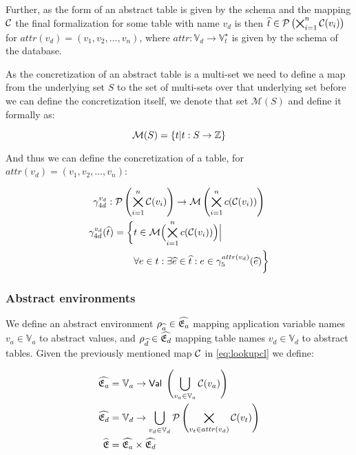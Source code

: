 Further, as the form of an abstract table is given by the schema and the mapping $\mathcal{C}$ the final formalization for some table with name $v_d$ is then $\widehat{t} \in \mathcal{P}\left(\bigtimes_{i = 1}^{n}\mathcal{C}(v_i)\right)$ for $attr(v_d) = (v_1, v_2, \dots, v_n)$, where $attr : \mathbb{V}_d \rightarrow \mathbb{V}_t^\star$ is given by the schema of the database.

As the concretization of an abstract table is a multi-set we need to define a map from the underlying set $S$ to the set of multi-sets over that underlying set before we can define the concretization itself, we denote that set $\mathcal{M}(S)$ and define it formally as:


\begin{equation}
    \mathcal{M}(S) = \{t | t : S \rightarrow \nums\}\label{eq:equation-nums}
\end{equation}


And thus we can define the concretization of a table, for $attr(v_d) = (v_1, v_2, \dots, v_n)$:


\begin{gather}
    \gamma^{v_d}_{4d} : \mathcal{P}\left(\bigtimes_{i = 1}^{n}\mathcal{C}(v_i)\right) \rightarrow \mathcal{M}\left(\bigtimes_{i = 1}^n c(\mathcal{C}(v_i))\right)\\
    \begin{split}
        \gamma^{v_d}_{4d}(\widehat{t}) = \biggl\{ &t \in \mathcal{M}\Bigl(\bigtimes_{i = 1}^n c(\mathcal{C}(v_i))\Bigr) \Big|\\
        &\forall e \in t : \exists \widehat{e} \in \widehat{t} : e \in \gamma^{attr(v_d)}_5(\widehat{e}) \biggr\}
    \end{split}
\end{gather}


\subsubsection{Abstract environments}\label{subsubsec:absenv}
We define an abstract environment $\rho_{\widehat{a}} \in \widehat{\mathfrak{E}_a}$ mapping application variable names $v_a \in \mathbb{V}_a$ to abstract values, and $\rho_{\widehat{d}} \in \widehat{\mathfrak{E}_d}$ mapping table names $v_d \in \mathbb{V}_d$ to abstract tables.
Given the previously mentioned map $\mathcal{C}$ in \autoref{eq:lookupcl} we define:


\begin{align} \label{eq:absenva}
    \ab{\mathfrak{E}_a} &= \mathbb{V}_a \rightarrow \mathsf{Val} \; \left( \bigcup_{v_a \in \mathbb{V}_a} \lookupcl(v_a) \right) \\ \label{eq:absenvd}
    \ab{\mathfrak{E}_d} &= \mathbb{V}_d \rightarrow \bigcup_{v_d \in \mathbb{V}_d} \mathcal{P}\left(\bigtimes_{v_t \in attr(v_d)}\lookupcl(v_t)\right) \\
    \ab{\mathfrak{E}} &= \ab{\mathfrak{E}_a} \times \ab{\mathfrak{E}_d}
\end{align}



